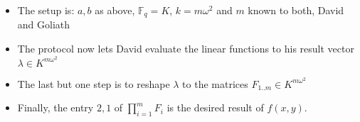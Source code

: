 \documentclass[12pt, a4paper]{article}
\begin{document}
\begin{itemize}

\item The setup is: $a, b$ as above, $\mathbb{F}_q = K$, $k = m\omega^2$ and $m$
known to both, David and Goliath

\item The protocol now lets David evaluate the linear functions to his result
vector $\lambda \in K^{m\omega^2}$

\item The last but one step is to reshape $\lambda$ to the matrices $F_{1..m}
\in K^{m\omega^2}$

\item Finally, the entry $2, 1$ of $\prod_{i=1}^m F_i$ is the desired result of
$f(x,y)$.

\end{itemize}


\end{document}
